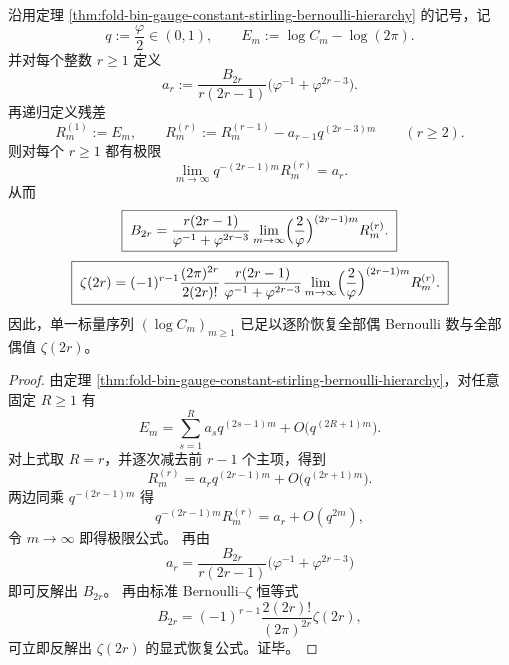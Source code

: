 \begin{theorem}\label{thm:xi-time-part60ab-gauge-constant-recursive-bernoulli-stripping}
沿用定理 \ref{thm:fold-bin-gauge-constant-stirling-bernoulli-hierarchy} 的记号，记
\[
q:=\frac{\varphi}{2}\in(0,1),
\qquad
E_m:=\log C_m-\log(2\pi).
\]
并对每个整数 \(r\ge 1\) 定义
\[
a_r:=
\frac{B_{2r}}{r(2r-1)}
\bigl(\varphi^{-1}+\varphi^{2r-3}\bigr).
\]
再递归定义残差
\[
R_m^{(1)}:=E_m,
\qquad
R_m^{(r)}:=R_m^{(r-1)}-a_{r-1}q^{(2r-3)m}
\qquad (r\ge 2).
\]
则对每个 \(r\ge 1\) 都有极限
\[
\boxed{\;
\lim_{m\to\infty}q^{-(2r-1)m}R_m^{(r)}=a_r.\;}
\]
从而
\[
\boxed{\;
B_{2r}
=
\frac{r(2r-1)}{\varphi^{-1}+\varphi^{2r-3}}
\lim_{m\to\infty}
\Bigl(\frac{2}{\varphi}\Bigr)^{(2r-1)m}R_m^{(r)}.\;}
\]
\[
\boxed{\;
\zeta(2r)
=
(-1)^{r-1}\frac{(2\pi)^{2r}}{2(2r)!}\,
\frac{r(2r-1)}{\varphi^{-1}+\varphi^{2r-3}}
\lim_{m\to\infty}
\Bigl(\frac{2}{\varphi}\Bigr)^{(2r-1)m}R_m^{(r)}.\;}
\]
因此，单一标量序列 \((\log C_m)_{m\ge 1}\) 已足以逐阶恢复全部偶 Bernoulli 数与全部偶值 \(\zeta(2r)\)。
\end{theorem}
\begin{proof}
由定理 \ref{thm:fold-bin-gauge-constant-stirling-bernoulli-hierarchy}，对任意固定 \(R\ge 1\) 有
\[
E_m
=
\sum_{s=1}^{R}a_s q^{(2s-1)m}
+O\!\bigl(q^{(2R+1)m}\bigr).
\]
对上式取 \(R=r\)，并逐次减去前 \(r-1\) 个主项，得到
\[
R_m^{(r)}
=
a_r q^{(2r-1)m}+O\!\bigl(q^{(2r+1)m}\bigr).
\]
两边同乘 \(q^{-(2r-1)m}\) 得
\[
q^{-(2r-1)m}
R_m^{(r)}
=
a_r+O(q^{2m}),
\]
令 \(m\to\infty\) 即得极限公式。
再由
\[
a_r=
\frac{B_{2r}}{r(2r-1)}
\bigl(\varphi^{-1}+\varphi^{2r-3}\bigr)
\]
即可反解出 \(B_{2r}\)。
再由标准 Bernoulli--\(\zeta\) 恒等式
\[
B_{2r}
=
(-1)^{r-1}\frac{2(2r)!}{(2\pi)^{2r}}\zeta(2r),
\]
可立即反解出 \(\zeta(2r)\) 的显式恢复公式。证毕。
\end{proof}

